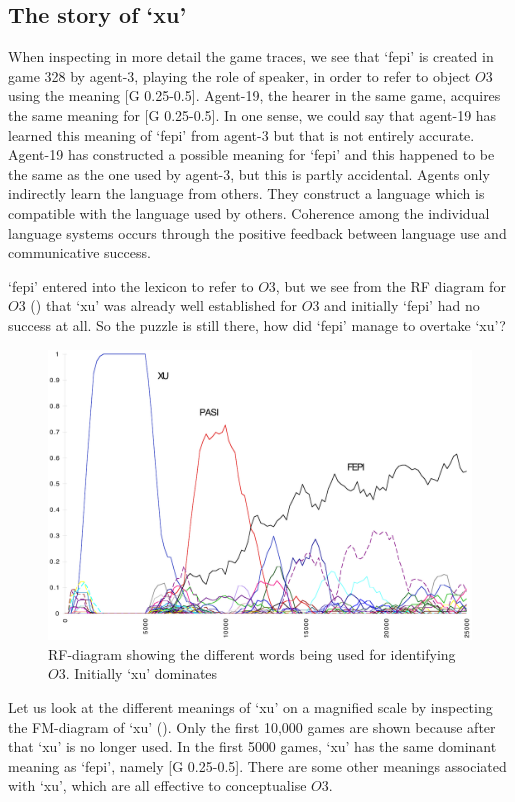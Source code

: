 \subsection{The story of `xu'}

When inspecting in more detail the game traces,
we see that `fepi' is created in game 328 by agent-3, playing the
role of speaker, in order to refer to object $O3$ using 
the meaning [G 0.25-0.5]. Agent-19, the hearer in the same 
game, acquires the same meaning for [G 0.25-0.5]. In one sense,
we could say that agent-19 has learned this meaning of `fepi' from
agent-3 but that is not entirely accurate. Agent-19 
has constructed a possible meaning for `fepi' and this happened
to be the same as the one used by agent-3,
but this is partly accidental. 
Agents only indirectly learn the language from others. They construct
a language which is compatible with the language used by others. 
Coherence among the individual
language systems occurs through the positive feedback between
language use and communicative success.

`fepi' entered into the lexicon to refer to $O3$, but we see
from the RF diagram for $O3$ () that 
`xu' was already well established for $O3$ and initially 
`fepi' had no success at all. 
So the puzzle is still there, how did `fepi' manage to 
overtake `xu'? 

\begin{figure}[htbp]
  \centerline{\includegraphics[width=.80\textwidth]{chap7/figs/RF-O3}}
\caption{ \label{RF-O3a} RF-diagram showing the different
words being used for identifying $O3$. Initially `xu' 
dominates }
\end{figure}
Let us look at the different meanings of `xu' on 
a magnified scale by 
inspecting the FM-diagram of `xu' (). 
Only the first 10,000 games are shown because after
that `xu' is no longer used. In the first 5000 games,  
`xu' has the same dominant meaning as `fepi', namely
[G 0.25-0.5]. There are some other meanings 
associated with `xu', which are all effective 
to conceptualise $O3$.

